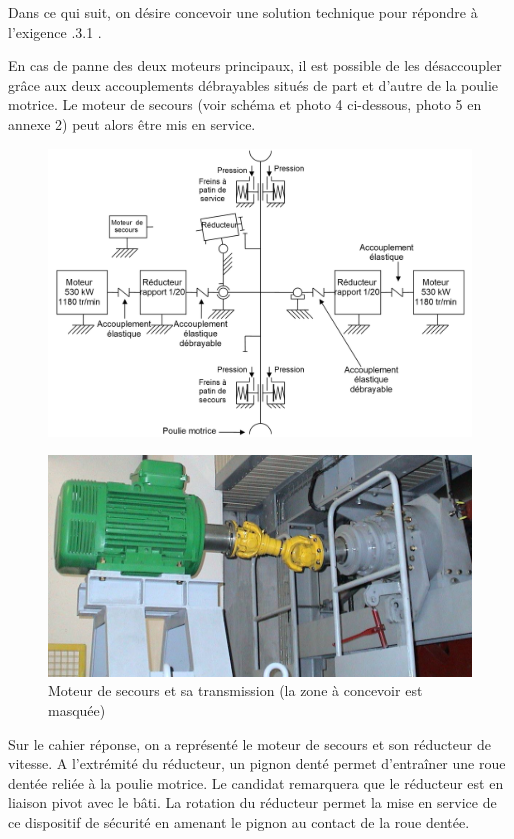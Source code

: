 Dans ce qui suit, on désire concevoir une solution technique pour répondre à l'exigence .3.1 \fg.

En cas de panne des deux moteurs principaux, il est possible de les désaccoupler grâce aux deux accouplements débrayables situés de part et d'autre de la poulie motrice. Le moteur de secours (voir schéma et photo 4 ci-dessous, photo 5 en annexe 2) peut alors être mis en service.

\begin{figure}[!h]
\centering
\includegraphics[width=0.9\linewidth]{img/fig33}
\label{fig33}
\end{figure}

\begin{figure}[!h]
\centering
\includegraphics[width=0.8\linewidth]{img/fig34}
\caption{Moteur de secours et sa transmission (la zone à concevoir est masquée)}
\label{fig34}
\end{figure}

Sur le cahier réponse, on a représenté le moteur de secours et son réducteur de vitesse. A l'extrémité du réducteur, un pignon denté permet d'entraîner une roue dentée reliée à la poulie motrice. Le candidat remarquera que le réducteur est en liaison pivot avec le bâti. La rotation du réducteur permet la mise en service de ce dispositif de sécurité en amenant le pignon au contact de la roue dentée.

